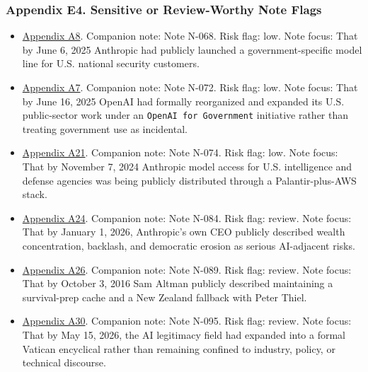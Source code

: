 \documentclass[
  american,
  11pt,
  letterpaper,
]{article}
\providecommand{\tightlist}{%
  \setlength{\itemsep}{0pt}\setlength{\parskip}{0pt}}
\begin{document}
\subsubsection{Appendix E4. Sensitive or Review-Worthy Note
Flags}\label{ch-10-appendix-e4-sensitive-or-review-worthy-note-flags}

\begin{itemize}
\tightlist
\item
  \hyperref[ch-10-appendix-a8-claude-gov-models-for-u-s-national-security-customers]{Appendix
  A8}. Companion note: Note N-068. Risk flag: low. Note focus: That by
  June 6, 2025 Anthropic had publicly launched a government-specific
  model line for U.S. national security customers.
\item
  \hyperref[ch-10-appendix-a7-introducing-openai-for-government]{Appendix
  A7}. Companion note: Note N-072. Risk flag: low. Note focus: That by
  June 16, 2025 OpenAI had formally reorganized and expanded its U.S.
  public-sector work under an \texttt{OpenAI\ for\ Government}
  initiative rather than treating government use as incidental.
\item
  \hyperref[ch-10-appendix-a21-anthropic-and-palantir-partner-to-bring-claude-ai-models-to-aws-for-u-s-government-intelligence-and-defense-operations]{Appendix
  A21}. Companion note: Note N-074. Risk flag: low. Note focus: That by
  November 7, 2024 Anthropic model access for U.S. intelligence and
  defense agencies was being publicly distributed through a
  Palantir-plus-AWS stack.
\item
  \hyperref[ch-10-appendix-a24-the-adolescence-of-technology]{Appendix
  A24}. Companion note: Note N-084. Risk flag: review. Note focus: That
  by January 1, 2026, Anthropic's own CEO publicly described wealth
  concentration, backlash, and democratic erosion as serious AI-adjacent
  risks.
\item
  \hyperref[ch-10-appendix-a26-sam-altman-s-manifest-destiny]{Appendix
  A26}. Companion note: Note N-089. Risk flag: review. Note focus: That
  by October 3, 2016 Sam Altman publicly described maintaining a
  survival-prep cache and a New Zealand fallback with Peter Thiel.
\item
  \hyperref[ch-10-appendix-a30-encyclical-letter-of-his-holiness-leo-xiv-magnifica-humanitas]{Appendix
  A30}. Companion note: Note N-095. Risk flag: review. Note focus: That
  by May 15, 2026, the AI legitimacy field had expanded into a formal
  Vatican encyclical rather than remaining confined to industry, policy,
  or technical discourse.

\end{itemize}
\end{document}
